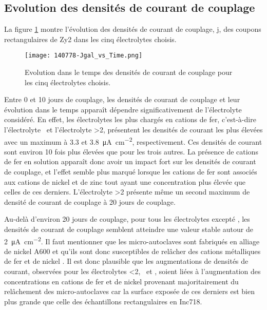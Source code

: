 \begin{refsection}
    \subsection{Evolution des densités de courant de couplage}\label{subsec:current_density}

    La figure \ref{fig:ch4_jgal_coupling}
    montre l’évolution des densités de courant de couplage, j, des coupons rectangulaires de Zy2 
    dans les cinq électrolytes choisis.

    \begin{figure}[H]
        \centering
            \texttt{[image: 140778-Jgal\_vs\_Time.png]}
        \caption{Evolution dans le temps des densités de courant de couplage pour les cinq électrolytes choisis.}
        \label{fig:ch4_jgal_coupling}
    \end{figure}

    Entre 0 et 10 jours de couplage, les densités de courant de couplage et leur évolution dans le
    temps apparaît dépendre significativement de l’électrolyte considéré. En effet, les électrolytes
    les plus chargés en cations de fer, c’est-à-dire l’électrolyte \FeII\ et l’électrolyte
    \ratio >2, présentent les densités de courant les plus élevées avec un maximum
    à 3.3 et \SI{3.8}{\micro\ampere\per\square\centi\meter}, respectivement. Ces densités de courant sont environ 10 fois plus élevées 
    que pour les trois autres. La présence de cations de fer en solution apparaît donc avoir un impact
    fort sur les densités de courant de couplage, et l’effet semble plus marqué lorsque les cations de 
    fer sont associés aux cations de nickel et de zinc tout ayant une concentration plus élevée que celles
    de ces derniers. L’électrolyte \ratio >2 présente même un second maximum de densité de courant
    de couplage à 20 jours de couplage.

    Au-delà d’environ 20 jours de couplage, pour tous les électrolytes excepté \water, les densités de courant de couplage
    semblent atteindre une valeur stable autour de \SI{2}{\micro\ampere\per\square\centi\meter}. Il faut mentionner que les micro-autoclaves sont fabriqués
    en alliage de nickel A600 et qu’ils sont donc susceptibles de relâcher des cations métalliques de fer et de nickel
    \citep{Sennour2010}.
    Il est donc plausible que les augmentations de densités de courant, observées pour les électrolytes
    \ratio <2, \NaSO\ et \water, soient liées à l’augmentation des concentrations en cations de fer et de nickel
    provenant majoritairement du relâchement des micro-autoclaves car la surface exposée de ces derniers est bien plus grande
    que celle des échantillons rectangulaires en Inc718.


\end{refsection}
